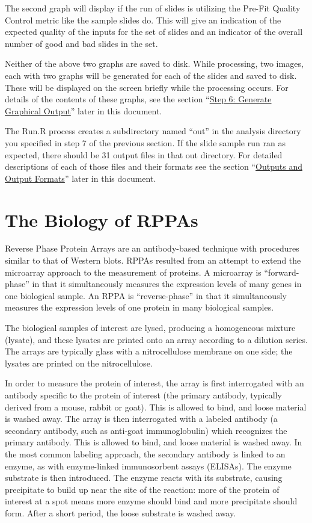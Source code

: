 \documentclass[
]{article}
\begin{document}
The second graph will display if the run of slides is utilizing the
Pre-Fit Quality Control metric like the sample slides do. This will give
an indication of the expected quality of the inputs for the set of
slides and an indicator of the overall number of good and bad slides in
the set.

Neither of the above two graphs are saved to disk. While processing, two
images, each with two graphs will be generated for each of the slides
and saved to disk. These will be displayed on the screen briefly while
the processing occurs. For details of the contents of these graphs, see
the section ``\protect\hyperlink{process_6}{Step 6: Generate Graphical
Output}'' later in this document.

The Run.R process creates a subdirectory named ``out'' in the analysis
directory you specified in step 7 of the previous section. If the slide
sample run ran as expected, there should be 31 output files in that out
directory. For detailed descriptions of each of those files and their
formats see the section ``\protect\hyperlink{outputs}{Outputs and Output
Formats}'' later in this document.

\newpage

\hypertarget{biology}{%
\section{The Biology of RPPAs}\label{biology}}

Reverse Phase Protein Arrays are an antibody-based technique with
procedures similar to that of Western blots. RPPAs resulted from an
attempt to extend the microarray approach to the measurement of
proteins. A microarray is ``forward-phase'' in that it simultaneously
measures the expression levels of many genes in one biological sample.
An RPPA is ``reverse-phase'' in that it simultaneously measures the
expression levels of one protein in many biological samples.

The biological samples of interest are lysed, producing a homogeneous
mixture (lysate), and these lysates are printed onto an array according
to a dilution series. The arrays are typically glass with a
nitrocellulose membrane on one side; the lysates are printed on the
nitrocellulose.

In order to measure the protein of interest, the array is first
interrogated with an antibody specific to the protein of interest (the
primary antibody, typically derived from a mouse, rabbit or goat). This
is allowed to bind, and loose material is washed away. The array is then
interrogated with a labeled antibody (a secondary antibody, such as
anti-goat immunoglobulin) which recognizes the primary antibody. This is
allowed to bind, and loose material is washed away. In the most common
labeling approach, the secondary antibody is linked to an enzyme, as
with enzyme-linked immunosorbent assays (ELISAs). The enzyme substrate
is then introduced. The enzyme reacts with its substrate, causing
precipitate to build up near the site of the reaction: more of the
protein of interest at a spot means more enzyme should bind and more
precipitate should form. After a short period, the loose substrate is
washed away.
\end{document}
